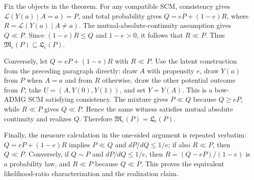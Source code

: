 Fix the objects in the theorem.  For any compatible SCM, consistency gives \(\mathcal L(Y(a)\mid A=a)=P\), and total probability gives \(Q=eP+(1-e)R\), where \(R=\mathcal L(Y(a)\mid A\ne a)\).  The mutual-absolute-continuity assumption gives \(Q\ll P\).  Since \((1-e)R\le Q\) and \(1-e>0\), it follows that \(R\ll P\).  Thus \(\mathfrak M_e(P)\subseteq\mathfrak L_e(P)\).

Conversely, let \(Q=eP+(1-e)R\) with \(R\ll P\).  Use the latent construction from the preceding paragraph directly: draw \(A\) with propensity \(e\), draw \(Y(a)\) from \(P\) when \(A=a\) and from \(R\) otherwise, draw the other potential outcome from \(P\), take \(U=(A,Y(0),Y(1))\), and set \(Y=Y(A)\).  This is a bow-ADMG SCM satisfying consistency.  The mixture gives \(P\ll Q\) because \(Q\ge eP\), while \(R\ll P\) gives \(Q\ll P\).  Hence the same witness satisfies mutual absolute continuity and realizes \(Q\).  Therefore \(\mathfrak M_e(P)=\mathfrak L_e(P)\).

Finally, the measure calculation in the one-sided argument is repeated verbatim: \(Q=eP+(1-e)R\) implies \(P\ll Q\) and \(dP/dQ\le1/e\); if also \(R\ll P\), then \(Q\ll P\).  Conversely, if \(Q\sim P\) and \(dP/dQ\le1/e\), then \(R=(Q-eP)/(1-e)\) is a probability law, and \(R\ll P\) because \(Q\ll P\).  This proves the equivalent likelihood-ratio characterization and the realization claim.